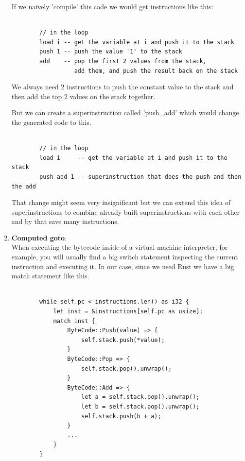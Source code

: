 \documentclass{article}
\begin{document}
\begin{enumerate}
        If we naively 'compile' this code we would get instructions like this:

        \begin{verbatim}

        // in the loop
        load i -- get the variable at i and push it to the stack
        push 1 -- push the value '1' to the stack
        add    -- pop the first 2 values from the stack, 
                  add them, and push the result back on the stack

        \end{verbatim}

        We always need 2 instructions to push the constant value to the stack and then add the top
        2 values on the stack together.

        But we can create a superinstruction called 'push\_add' which would change the generated
        code to this.

        \begin{verbatim}

        // in the loop
        load i     -- get the variable at i and push it to the stack
        push_add 1 -- superinstruction that does the push and then the add

        \end{verbatim}

        That change might seem very insignificant but we can extend this idea
        of superinstructions to combine already built superinstructions with
        each other and by that save many instructions.


    \item \textbf{Computed goto}:\\
    \label{it:goto}
        When executing the bytecode inside of a virtual machine interpreter, for
        example, you will usually find a big switch statement inspecting the
        current instruction and executing it. In our case, since we used Rust
        we have a big match statement like this.

        \begin{verbatim}

        while self.pc < instructions.len() as i32 {
            let inst = &instructions[self.pc as usize];
            match inst {
                ByteCode::Push(value) => {
                    self.stack.push(*value);
                }
                ByteCode::Pop => {
                    self.stack.pop().unwrap();
                }
                ByteCode::Add => {
                    let a = self.stack.pop().unwrap();
                    let b = self.stack.pop().unwrap();
                    self.stack.push(b + a);
                }
                ...
            }
        }
        \end{verbatim}


\end{enumerate}
\end{document}
